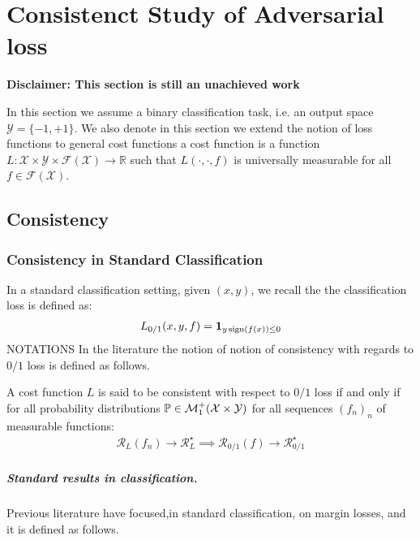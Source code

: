 \chapter{Consistenct Study of Adversarial loss}
\minitoc
\textbf{Disclaimer: This section is still an unachieved work}

In this section we assume a binary classification task, i.e. an output space $\mathcal{Y}=\{-1,+1\}$. We also denote in this section we extend the notion of loss functions to general cost functions a cost function is a function $L:\mathcal{X}\times\mathcal{Y}\times \mathcal{F}(\mathcal{X})\to \mathbb{R}$ such that $L(\cdot,\cdot,f)$ is universally measurable for all $f\in\mathcal{F}(\mathcal{X})$. 


\section{Consistency}

\subsection{Consistency in Standard Classification}
In a standard classification setting,  given $(x,y)$, we recall the  the classification loss is defined as:
\begin{align*}
    L_{0/1}(x,y,f) = \mathbf{1}_{y\operatorname*{sign}(f(x))\leq 0}
\end{align*}
NOTATIONS
In the literature the notion of notion of consistency with regards to $0/1$ loss is defined as follows.
\begin{definition}[Consistency]
A cost function $L$ is said to be consistent with respect to $0/1$ loss if and only if for all probability distributions $\mathbb{P}\in\mathcal{M}_1^+(\mathcal{X}\times\mathcal{Y})$ for all sequences $(f_n)_n $ of measurable functions:
\begin{align}
    \mathcal{R}_{L}(f_n)\to \mathcal{R}_{L}^\star\implies\mathcal{R}_{0/1}(f)\to \mathcal{R}_{0/1}^\star
\end{align}
\end{definition}


\paragraph{Standard results in classification.} Previous literature have focused,in standard classification, on margin losses, and it is defined as follows.

